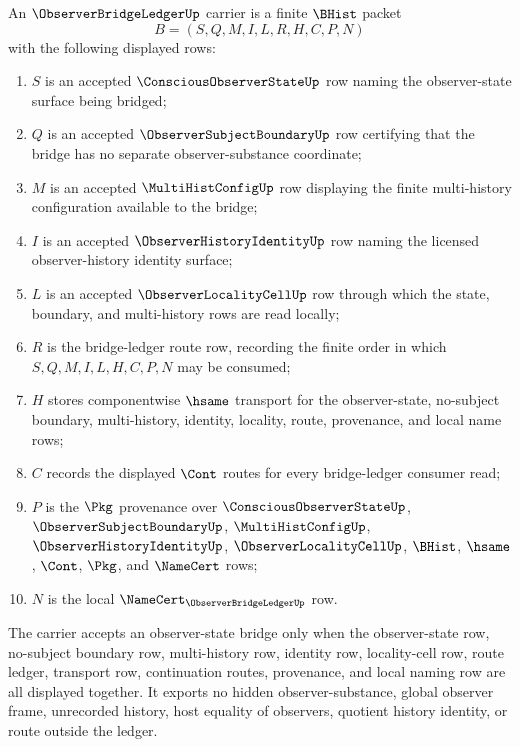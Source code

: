 \begin{definition}
\label{def:observer-bridge-ledger-carrier}
An $\ObserverBridgeLedgerUp$ carrier is a finite $\BHist$ packet
$$
B=(S,Q,M,I,L,R,H,C,P,N)
$$
with the following displayed rows:
\begin{enumerate}
\item $S$ is an accepted $\ConsciousObserverStateUp$ row naming the observer-state surface being bridged;
\item $Q$ is an accepted $\ObserverSubjectBoundaryUp$ row certifying that the bridge has no separate observer-substance coordinate;
\item $M$ is an accepted $\MultiHistConfigUp$ row displaying the finite multi-history configuration available to the bridge;
\item $I$ is an accepted $\ObserverHistoryIdentityUp$ row naming the licensed observer-history identity surface;
\item $L$ is an accepted $\ObserverLocalityCellUp$ row through which the state, boundary, and multi-history rows are read locally;
\item $R$ is the bridge-ledger route row, recording the finite order in which $S,Q,M,I,L,H,C,P,N$ may be consumed;
\item $H$ stores componentwise $\hsame$ transport for the observer-state, no-subject boundary, multi-history, identity, locality, route, provenance, and local name rows;
\item $C$ records the displayed $\Cont$ routes for every bridge-ledger consumer read;
\item $P$ is the $\Pkg$ provenance over $\ConsciousObserverStateUp$, $\ObserverSubjectBoundaryUp$, $\MultiHistConfigUp$, $\ObserverHistoryIdentityUp$, $\ObserverLocalityCellUp$, $\BHist$, $\hsame$, $\Cont$, $\Pkg$, and $\NameCert$ rows;
\item $N$ is the local $\NameCert_{\ObserverBridgeLedgerUp}$ row.
\end{enumerate}
The carrier accepts an observer-state bridge only when the observer-state row, no-subject boundary row, multi-history row, identity row, locality-cell row, route ledger, transport row, continuation routes, provenance, and local naming row are all displayed together. It exports no hidden observer-substance, global observer frame, unrecorded history, host equality of observers, quotient history identity, or route outside the ledger.
\end{definition}

